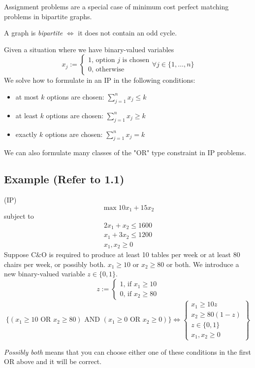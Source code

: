 Assignment problems are a special case of minimum cost perfect matching problems
in bipartite graphs.
\begin{remark}
    A graph is \emph{bipartite} $\iff$ it does not contain an odd cycle.
\end{remark}
Given a situation where we have binary-valued variables 
\[x_j:=
    \begin{cases}
        1 \text{, option $j$ is chosen}\\
        0 \text{, otherwise}
    \end{cases}
    \forall j\in\{1,\dots,n\}
\]
We solve how to formulate in an IP in the following conditions:
\begin{itemize}
    \item at most $k$ options are chosen: $\sum\limits_{j=1}^n x_j\le k$
    \item at least $k$ options are chosen: $\sum\limits_{j=1}^n x_j\ge k$
    \item exactly $k$ options are chosen: $\sum\limits_{j=1}^n x_j=k$
\end{itemize}
We can also formulate many classes of the "OR" type constraint in IP problems.

\subsection{Example (Refer to 1.1)}
(IP)
\[\max 10x_1 + 15x_2\]
subject to
\begin{align*}
    2x_1 + x_2 \le 1600\\
    x_1 + 3x_2 \le 1200\\
    x_1, x_2 \ge 0
\end{align*}
Suppose C\&O is required to produce at least 10 tables per week or at least 80
chairs per week, or possibly both. $x_1\ge 10$ or $x_2\ge 80$ or both. We
introduce a new binary-valued variable $z\in\{0,1\}$.
\[
    z:=
    \begin{cases}
        1 \text{, if } x_1\ge 10\\
        0 \text{, if } x_2\ge 80
    \end{cases}
\]
\[
   \{(x_1\ge 10 \text{ OR } x_2\ge 80) \text{ AND } 
   (x_1\ge 0 \text{ OR } x_2\ge 0)\}
    \iff
    \left\{\begin{array}{r}
        x_1\ge 10z\\
        x_2\ge 80(1-z)\\
        z\in\{0,1\}\\
        x_1,x_2\ge 0
    \end{array}\right\}
\]
\begin{remark}
    \emph{Possibly both} means that you can choose either one of these
    conditions in the first OR above and it will be correct.
\end{remark}

